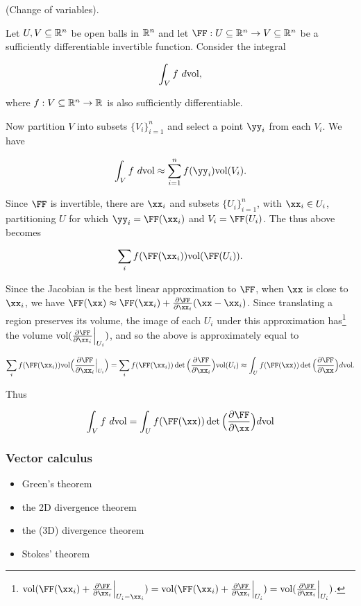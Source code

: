 \begin{deriv}
    (Change of variables).
    
    Let $U, V \subseteq \mathbb{R}^n$ be open balls in $\mathbb{R}^n$ and let $\FF:U \subseteq \R^n \rightarrow V \subseteq \R^n$ be a sufficiently differentiable invertible function. Consider the integral

    \begin{align*}
        \int_V f \text{ } d\text{vol},
    \end{align*}

    where $f:V \subseteq \mathbb{R}^n \rightarrow \mathbb{R}$ is also sufficiently differentiable.

    Now partition $V$ into subsets $\{V_i\}_{i = 1}^n$ and select a point $\yy_i$ from each $V_i$. We have

    \begin{align*}
        \int_V f \spc d\text{vol} \approx \sum_{i = 1}^n f(\yy_i) \text{vol}(V_i).
    \end{align*}

    Since $\FF$ is invertible, there are $\xx_i$ and subsets $\{U_i\}_{i = 1}^n$, with $\xx_i \in U_i$, partitioning $U$ for which $\yy_i = \FF(\xx_i)$ and $V_i = \FF(U_i)$. The thus above becomes

    \begin{align*}
        \sum_i f(\FF(\xx_i)) \text{vol}(\FF(U_i)).
    \end{align*}

    Since the Jacobian is the best linear approximation to $\FF$, when $\xx$ is close to $\xx_i$, we have $\FF(\xx) \approx \FF(\xx_i) + \frac{\pd \FF}{\pd \xx_i}(\xx - \xx_i)$. Since translating a region preserves its volume, the image of each $U_i$ under this approximation has\footnote{$\text{vol}(\FF(\xx_i) + \frac{\pd \FF}{\pd \xx_i}\Big|_{U_i - \xx_i}) = \text{vol}(\FF(\xx_i) + \frac{\pd \FF}{\pd \xx_i}\Big|_{U_i}) = \text{vol}(\frac{\pd \FF}{\pd \xx_i}\Big|_{U_i})$.} the volume $\text{vol}(\frac{\pd \FF}{\pd \xx_i}\Big|_{U_i})$, and so the above is approximately equal to

    \begin{align*}
        \sum_i f(\FF(\xx_i)) \text{vol}\Big(\frac{\pd \FF}{\pd \xx_i}\Big|_{U_i}\Big)
        =
        \sum_i f(\FF(\xx_i)) \det\Big( \frac{\pd \FF}{\pd \xx_i} \Big) \text{vol}(U_i)
        \approx 
        \int_U f(\FF(\xx)) \det\Big( \frac{\pd \FF}{\pd \xx} \Big) d\text{vol}.
    \end{align*}

    Thus

    \begin{align*}
        \int_V f \spc d\text{vol} = \int_U f(\FF(\xx)) \det\Big( \frac{\pd \FF}{\pd \xx} \Big) d \text{vol}
    \end{align*}
\end{deriv}

\subsubsection*{Vector calculus}

\begin{itemize}
    \item Green's theorem
    \item the 2D divergence theorem
    \item the (3D) divergence theorem
    \item Stokes' theorem
\end{itemize}

